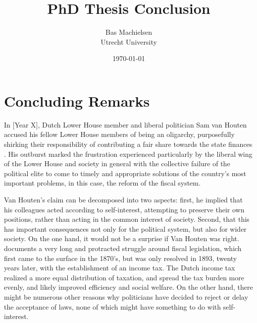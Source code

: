 

\title{\textbf{PhD Thesis Conclusion}}
\author{Bas Machielsen \\ Utrecht University}
\date{\today}



\maketitle

\section{Concluding Remarks}

In [Year X], Dutch Lower House member and liberal politician Sam van Houten accused his fellow Lower House members of being an oligarchy, purposefully shirking their responsibility of contributing a fair share towards the state finances \citep{van2013eerste}. His outburst marked the frustration experienced particularly by the liberal wing of the Lower House and society in general with the collective failure of the political elite to come to timely and appropriate solutions of the country's most important problems, in this case, the reform of the fiscal system. 

Van Houten's claim can be decomposed into two aspects: first, he implied that his colleagues acted according to self-interest, attempting to preserve their own positions, rather than acting in the common interest of society. Second, that this has important consequences not only for the political system, but also for wider society. On the one hand, it would not be a surprise if Van Houten was right. \cite{smit2002omwille} documents a very long and protracted struggle around fiscal legislation, which first came to the surface in the 1870's, but was only resolved in 1893, twenty years later, with the establishment of an income tax. The Dutch income tax realized a more equal distribution of taxation, and spread the tax burden more evenly, and likely improved efficiency and social welfare. On the other hand, there might be numerous other reasons why politicians have decided to reject or delay the acceptance of laws, none of which might have something to do with self-interest. 

